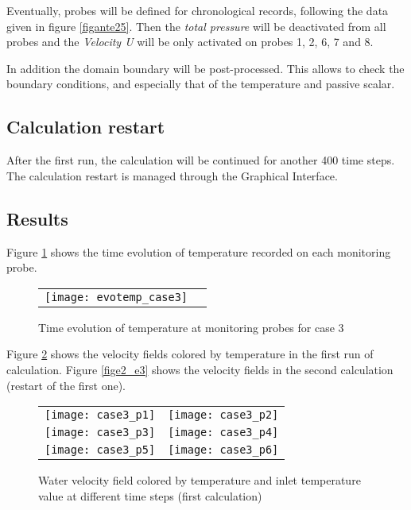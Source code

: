 Eventually, probes will be defined for chronological records, following the data
given in figure \ref{figante25}. Then the {\itshape total pressure} will be
deactivated from all probes and the {\itshape Velocity U} will be only activated
on probes  1, 2, 6, 7 and 8.


In addition the domain boundary will be post-processed. This allows to check the
boundary conditions, and especially that of the temperature and passive scalar.


        \subsection{Calculation restart}

After the first run, the calculation will be continued for another 400 time
steps. The calculation restart is managed through the Graphical Interface.


        \subsection{Results}
Figure \ref{fige3_e3} shows the time evolution of temperature recorded on each
monitoring probe.
\begin{figure}[hb]
\begin{center}
\begin{tabular}{cc}
\texttt{[image: evotemp\_case3]} \\
\end{tabular}
\caption{Time evolution of temperature at monitoring probes for case 3}
\label{fige3_e3}
\end{center}
\end{figure}

Figure \ref{fige1_e3} shows the velocity fields colored by temperature in the
first run of calculation. Figure \ref{fige2_e3} shows the velocity fields in the
second calculation (restart of the first one).

\begin{figure}
\begin{center}
\begin{tabular}{cc}
\texttt{[image: case3\_p1]} &
\texttt{[image: case3\_p2]} \\
\texttt{[image: case3\_p3]} &
\texttt{[image: case3\_p4]} \\
\texttt{[image: case3\_p5]} &
\texttt{[image: case3\_p6]} \\
\end{tabular}
\caption{Water velocity field colored by temperature and inlet temperature value
at different time steps (first calculation)}
\label{fige1_e3}
\end{center}
\end{figure}


